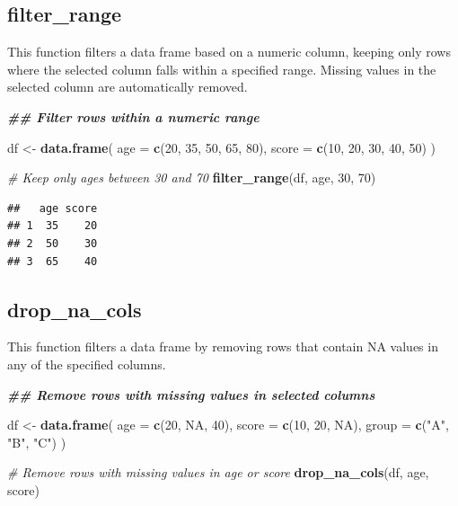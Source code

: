 \documentclass[
]{book}
\newenvironment{Shaded}{\begin{snugshade}}{\end{snugshade}}
\newcommand{\AttributeTok}[1]{\textcolor[rgb]{0.13,0.29,0.53}{#1}}
\newcommand{\CommentTok}[1]{\textcolor[rgb]{0.56,0.35,0.01}{\textit{#1}}}
\newcommand{\ConstantTok}[1]{\textcolor[rgb]{0.56,0.35,0.01}{#1}}
\newcommand{\DecValTok}[1]{\textcolor[rgb]{0.00,0.00,0.81}{#1}}
\newcommand{\DocumentationTok}[1]{\textcolor[rgb]{0.56,0.35,0.01}{\textbf{\textit{#1}}}}
\newcommand{\FunctionTok}[1]{\textcolor[rgb]{0.13,0.29,0.53}{\textbf{#1}}}
\newcommand{\NormalTok}[1]{#1}
\newcommand{\OtherTok}[1]{\textcolor[rgb]{0.56,0.35,0.01}{#1}}
\newcommand{\StringTok}[1]{\textcolor[rgb]{0.31,0.60,0.02}{#1}}
\begin{document}
\subsection{filter\_range}\label{filter_range}

This function filters a data frame based on a numeric column, keeping only rows where the selected column falls within a specified range. Missing values in the selected column are automatically removed.

\begin{Shaded}
\begin{Highlighting}[]
\DocumentationTok{\#\# Filter rows within a numeric range}

\NormalTok{df }\OtherTok{\textless{}{-}} \FunctionTok{data.frame}\NormalTok{(}
    \AttributeTok{age =} \FunctionTok{c}\NormalTok{(}\DecValTok{20}\NormalTok{, }\DecValTok{35}\NormalTok{, }\DecValTok{50}\NormalTok{, }\DecValTok{65}\NormalTok{, }\DecValTok{80}\NormalTok{),}
    \AttributeTok{score =} \FunctionTok{c}\NormalTok{(}\DecValTok{10}\NormalTok{, }\DecValTok{20}\NormalTok{, }\DecValTok{30}\NormalTok{, }\DecValTok{40}\NormalTok{, }\DecValTok{50}\NormalTok{)}
\NormalTok{  )}

\CommentTok{\# Keep only ages between 30 and 70}
\FunctionTok{filter\_range}\NormalTok{(df, age, }\DecValTok{30}\NormalTok{, }\DecValTok{70}\NormalTok{)}
\end{Highlighting}
\end{Shaded}

\begin{verbatim}
##   age score
## 1  35    20
## 2  50    30
## 3  65    40
\end{verbatim}

\subsection{drop\_na\_cols}\label{drop_na_cols}

This function filters a data frame by removing rows that contain NA values in any of the specified columns.

\begin{Shaded}
\begin{Highlighting}[]
\DocumentationTok{\#\# Remove rows with missing values in selected columns}

\NormalTok{df }\OtherTok{\textless{}{-}} \FunctionTok{data.frame}\NormalTok{(}
  \AttributeTok{age =} \FunctionTok{c}\NormalTok{(}\DecValTok{20}\NormalTok{, }\ConstantTok{NA}\NormalTok{, }\DecValTok{40}\NormalTok{),}
  \AttributeTok{score =} \FunctionTok{c}\NormalTok{(}\DecValTok{10}\NormalTok{, }\DecValTok{20}\NormalTok{, }\ConstantTok{NA}\NormalTok{),}
  \AttributeTok{group =} \FunctionTok{c}\NormalTok{(}\StringTok{"A"}\NormalTok{, }\StringTok{"B"}\NormalTok{, }\StringTok{"C"}\NormalTok{)}
\NormalTok{)}

\CommentTok{\# Remove rows with missing values in age or score}
\FunctionTok{drop\_na\_cols}\NormalTok{(df, age, score)}
\end{Highlighting}
\end{Shaded}
\end{document}
